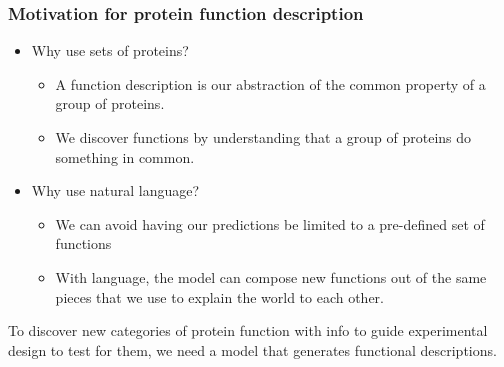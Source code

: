 \documentclass{beamer}
\begin{document}
\begin{frame}
\frametitle{Motivation for protein function description}

    \begin{itemize}
        \item Why use sets of proteins?\pause
            \begin{itemize}
                \item A function description is our abstraction of the common property of a group of proteins. \pause
                \item We discover functions by understanding that a group of proteins do something in common.\pause
            \end{itemize}
        \item Why use natural language?\pause
            \begin{itemize}
                \item We can avoid having our predictions be limited to a pre-defined set of functions\pause
                \item With language, the model can compose new functions out of the same pieces that we use to explain the world to each other.\pause
            \end{itemize}
    \end{itemize}
    To discover new categories of protein function with info to guide experimental design to test for them, we need a model that generates functional descriptions.
\end{frame}
\end{document}
